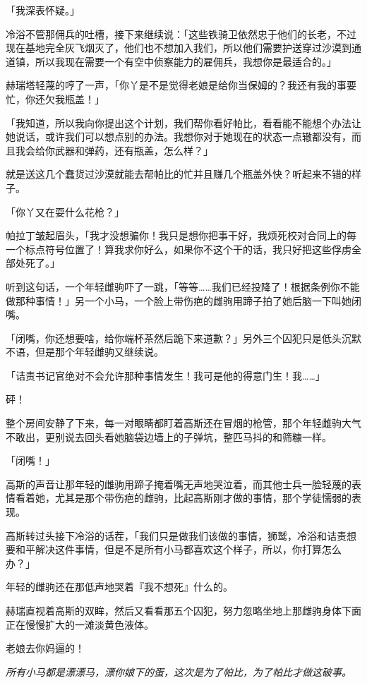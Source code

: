 「我深表怀疑。」

冷浴不管那佣兵的吐槽，接下来继续说：「这些铁骑卫依然忠于他们的长老，不过现在基地完全灰飞烟灭了，他们也不想加入我们，所以他们需要护送穿过沙漠到通道镇，所以我现在需要一个有空中侦察能力的雇佣兵，我想你是最适合的。」

赫瑞塔轻蔑的哼了一声，「你丫是不是觉得老娘是给你当保姆的？我还有我的事要忙，你还欠我瓶盖！」

「我知道，所以我向你提出这个计划，我们帮你看好帕比，看看能不能想个办法让她说话，或许我们可以想点别的办法。我想你对于她现在的状态一点辙都没有，而且我会给你武器和弹药，还有瓶盖，怎么样？」

就是送这几个蠢货过沙漠就能去帮帕比的忙并且赚几个瓶盖外快？听起来不错的样子。

「你丫又在耍什么花枪？」

帕拉丁皱起眉头，「我才没想骗你！我只是想你把事干好，我烦死校对合同上的每一个标点符号位置了！算我求你好么，如果你不这个干的话，我只好把这些俘虏全部处死了。」

听到这句话，一个年轻雌驹吓了一跳，「等等……我们已经投降了！根据条例你不能做那种事情！」另一个小马，一个脸上带伤疤的雌驹用蹄子拍了她后脑一下叫她闭嘴。


「闭嘴，你还想要啥，给你端杯茶然后跪下来道歉？」另外三个囚犯只是低头沉默不语，但是那个年轻雌驹又继续说。

「诘责书记官绝对不会允许那种事情发生！我可是他的得意门生！我……」

砰！

整个房间安静了下来，每一对眼睛都盯着高斯还在冒烟的枪管，那个年轻雌驹大气不敢出，更别说去回头看她脑袋边墙上的子弹坑，整匹马抖的和筛糠一样。

「闭嘴！」

高斯的声音让那年轻的雌驹用蹄子掩着嘴无声地哭泣着，而其他士兵一脸轻蔑的表情看着她，尤其是那个带伤疤的雌驹，比起高斯刚才做的事情，那个学徒懦弱的表现。

高斯转过头接下冷浴的话茬，「我们只是做我们该做的事情，狮鹫，冷浴和诘责想要和平解决这件事情，但是不是所有小马都喜欢这个样子，所以，你打算怎么办？」

年轻的雌驹还在那低声地哭着『我不想死』什么的。

赫瑞直视着高斯的双眸，然后又看看那五个囚犯，努力忽略坐地上那雌驹身体下面正在慢慢扩大的一滩淡黄色液体。

老娘去你妈逼的！

\emph{所有小马都是漂漂马，漂你娘下的蛋，这次是为了帕比，为了帕比才做这破事。}

